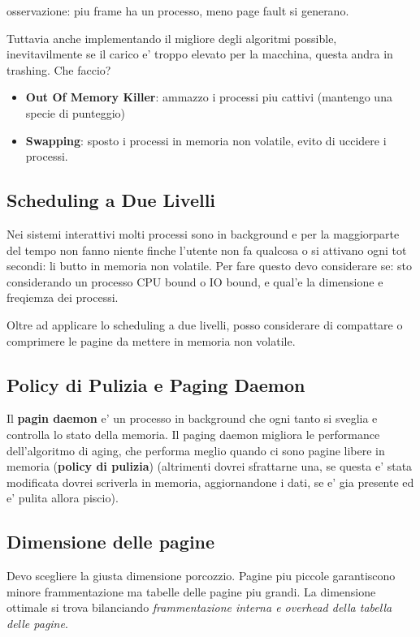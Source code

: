 osservazione: piu frame ha un processo, meno page fault si generano.

Tuttavia anche implementando il migliore degli algoritmi possible, inevitavilmente se il carico
e' troppo elevato per la macchina, questa andra in trashing. Che faccio?
\begin{itemize}
    \item \textbf{Out Of Memory Killer}: ammazzo i processi piu cattivi (mantengo una specie di punteggio)
    \item \textbf{Swapping}: sposto i processi in memoria non volatile, evito di uccidere i processi.
\end{itemize}

\subsection{Scheduling a Due Livelli}
Nei sistemi interattivi molti processi sono in background e per la maggiorparte del tempo non fanno niente finche
l'utente non fa qualcosa o si attivano ogni tot secondi: li butto in memoria non volatile.
Per fare questo devo considerare se: sto considerando un processo CPU bound o IO bound, e qual'e la dimensione e freqiemza dei processi.

Oltre ad applicare lo scheduling a due livelli, posso considerare di compattare o comprimere le pagine da mettere in memoria non volatile. 

\subsection{Policy di Pulizia e Paging Daemon}
Il \textbf{pagin daemon} e' un processo in background che ogni tanto si sveglia e controlla
lo stato della memoria. Il paging daemon migliora le performance dell'algoritmo di aging, che performa 
meglio quando ci sono pagine libere in memoria (\textbf{policy di pulizia}) (altrimenti dovrei sfrattarne una, se questa e' stata modificata dovrei scriverla in memoria,
aggiornandone i dati, se e' gia presente ed e' pulita allora piscio). 

\subsection{Dimensione delle pagine}
Devo scegliere la giusta dimensione porcozzio. Pagine piu piccole garantiscono minore frammentazione ma tabelle
delle pagine piu grandi. La dimensione ottimale si trova bilanciando \textit{frammentazione interna e overhead della tabella
delle pagine}.

